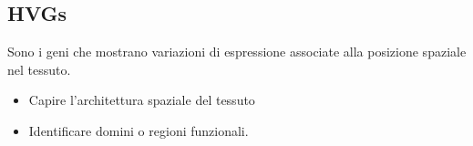 \documentclass{report}
\begin{document}
\subsection{HVGs}
Sono i geni che mostrano variazioni di espressione associate alla posizione spaziale nel tessuto.
\renewcommand{\labelitemi}{\checkmark}
\begin{itemize}
    \item Capire l’architettura spaziale del tessuto
    \item Identificare domini o regioni funzionali.
\end{itemize}


\end{document}
